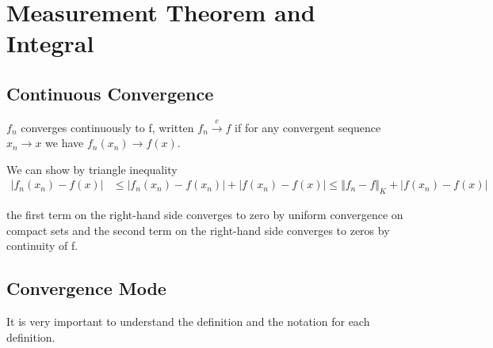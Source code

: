\section{Measurement Theorem and Integral}

\subsection{Continuous Convergence}


\begin{definition}
$f_n$ converges continuously to f, written $f_n \xrightarrow {c} f$ if for any convergent sequence $x_n \rightarrow x$ we have $f_n(x_n) \rightarrow f(x)$.

We can show by triangle inequality
\begin{align*}
	| f_n(x_n) - f(x)| & \leq |f_n(x_n) - f(x_n)| + |f(x_n) - f(x)| \leq \Vert f_n - f \Vert_K + |f(x_n) - f(x)|
\end{align*}

the first term on the right-hand side converges to zero by uniform convergence on compact sets and the second term on the right-hand side converges to zeros by continuity of f.

\end{definition}

\subsection{Convergence Mode}
It is very important to understand the definition and the notation for each definition.

